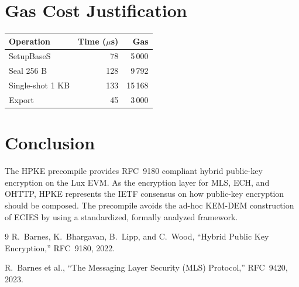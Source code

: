 \documentclass[11pt,a4paper]{article}
\begin{document}
\section{Gas Cost Justification}

\begin{table}[H]
\centering
\begin{tabular}{lrr}
\toprule
\textbf{Operation} & \textbf{Time ($\mu$s)} & \textbf{Gas} \\
\midrule
SetupBaseS & 78 & 5\,000 \\
Seal 256 B & 128 & 9\,792 \\
Single-shot 1 KB & 133 & 15\,168 \\
Export & 45 & 3\,000 \\
\bottomrule
\end{tabular}
\end{table}

\section{Conclusion}

The HPKE precompile provides RFC~9180 compliant hybrid public-key encryption on
the Lux EVM. As the encryption layer for MLS, ECH, and OHTTP, HPKE represents
the IETF consensus on how public-key encryption should be composed. The
precompile avoids the ad-hoc KEM-DEM construction of ECIES by using a
standardized, formally analyzed framework.

\begin{thebibliography}{9}
  R.~Barnes, K.~Bhargavan, B.~Lipp, and C.~Wood,
  ``Hybrid Public Key Encryption,'' RFC~9180, 2022.

  R.~Barnes et al., ``The Messaging Layer Security (MLS) Protocol,''
  RFC~9420, 2023.
\end{thebibliography}
\end{document}
